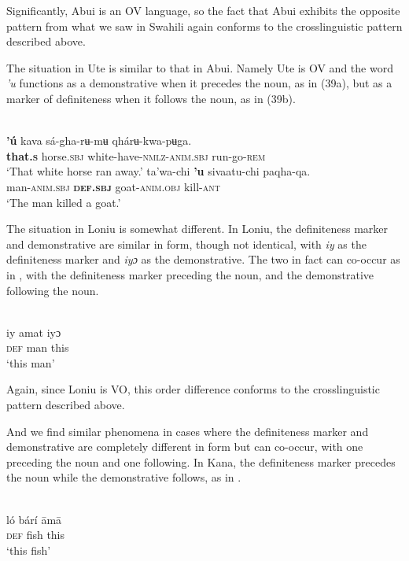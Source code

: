 \documentclass[output=paper]{langsci/langscibook}
\begin{document}
Significantly, Abui is an OV language, so the fact that Abui exhibits the opposite pattern from what we saw in Swahili again conforms to the crosslinguistic pattern described above.

The situation in Ute is similar to that in Abui. Namely Ute is OV and the word \textit{'u} functions as a demonstrative when it precedes the noun, as in (39a), but as a marker of definiteness when it follows the noun, as in (39b).

\ea\label{ex:dryer:39}
\\
\ea\label{ex:dryer:39a}
\gll     \textbf{'ú}  kava  sá-gha-rʉ-mʉ  qhárʉ-kwa-pʉga.\\
         \textbf{that.\textsc{s}}  horse.\textsc{sbj}  white-have-\textsc{nmlz-anim.sbj}  run-go-\textsc{rem}\\
\glt     ‘That white horse ran away.’
\ex\label{ex:dryer:39b}
\gll    ta'wa-chi  \textbf{'u}  sivaatu-chi  paqha-qa.\\
         man-\textsc{anim.sbj}  \textbf{\textsc{def.sbj}}  goat-\textsc{anim.obj}  kill-\textsc{ant}\\
\glt     ‘The man killed a goat.’
\z
\z

The situation in Loniu is somewhat different. In Loniu, the definiteness marker and demonstrative are similar in form, though not identical, with \textit{iy} as the definiteness marker and \textit{iyɔ} as the demonstrative. The two in fact can co-occur as in , with the definiteness marker preceding the noun, and the demonstrative following the noun.

\ea\label{ex:dryer:40}
\\
\gll   iy   amat   iyɔ\\
       \textsc{def}   man   this \\
\glt   ‘this man’
\z

Again, since Loniu is VO, this order difference conforms to the crosslinguistic pattern described above.

And we find similar phenomena in cases where the definiteness marker and demonstrative are completely different in form but can co-occur, with one preceding the noun and one following. In Kana, the definiteness marker precedes the noun while the demonstrative follows, as in .

\ea\label{ex:dryer:41}
\\
\gll   ló   bárí   āmā \\
       \textsc{def}   fish   this \\
\glt   ‘this fish’
\z
\end{document}
